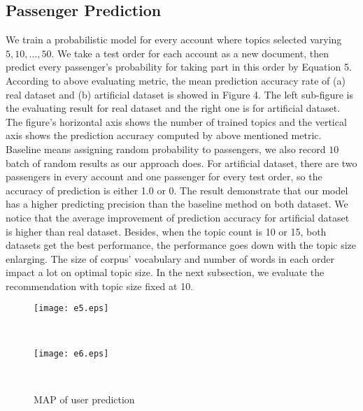\documentclass{sig-alternate-05-2015}
\begin{document}
\subsection{Passenger Prediction}
We train a probabilistic model for every account where topics selected varying ${5,10,\dots,50}$. We take a test order for each account as a new document, then predict every passenger's probability for taking part in this order by Equation 5. According to above evaluating metric, the mean prediction accuracy rate of (a) real dataset and (b) artificial dataset is showed in Figure 4. The left sub-figure is the evaluating result for real dataset and the right one is for artificial dataset. The figure's horizontal axis shows the number of trained topics and the vertical axis shows the prediction accuracy computed by above mentioned metric. Baseline means assigning random probability to passengers, we also record $10$ batch of random results as our approach does. For artificial dataset, there are two passengers in every account and one passenger for every test order, so the accuracy of prediction is either 1.0 or 0. The result demonstrate that our model has a higher predicting precision than the baseline method on both dataset. We notice that the average improvement of prediction accuracy for artificial dataset is higher than real dataset. Besides, when the topic count is 10 or 15, both datasets get the best performance, the performance goes down with the topic size enlarging. The size of corpus' vocabulary and number of words in each order impact a lot on optimal topic size. In the next subsection, we evaluate the recommendation with topic size fixed at 10.\par 

\begin{figure}[!h]
              \begin{minipage}[t]{0.47\linewidth}
              \centering
              \texttt{[image: e5.eps]}\\
              \label{Price_Distribution}
              \end{minipage}
              \begin{minipage}[t]{0.005\linewidth}~~~
              \end{minipage}
              \begin{minipage}[t]{0.47\linewidth}
              \centering
              \texttt{[image: e6.eps]}\\
              \label{Departure_Time_Distribution}
              \end{minipage}
              \begin{minipage}[t]{0.005\linewidth}~~~
              \end{minipage}
              \caption{MAP of user prediction}
          \label{total_rank}
          \vspace{-0.4cm}
\end{figure}
\end{document}
